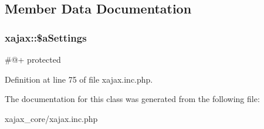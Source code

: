 \subsection{Member Data Documentation}
\hypertarget{classxajax_ab1d2d962855dad08a56b21b63e62c632}{
\subsubsection[{\$aSettings}]{\setlength{\rightskip}{0pt plus 5cm}xajax::\$aSettings}}
\label{classxajax_ab1d2d962855dad08a56b21b63e62c632}
\#@+  protected 

Definition at line 75 of file xajax.inc.php.



The documentation for this class was generated from the following file:\begin{DoxyCompactItemize}
\item 
xajax\_\-core/xajax.inc.php\end{DoxyCompactItemize}
